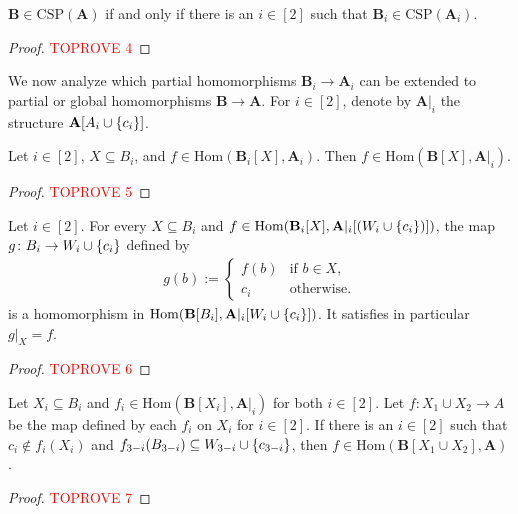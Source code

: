 \documentclass[a4paper,english, thm-restate]{lipics-v2021}
\DeclarePairedDelimiter\set{\lbrace}{\rbrace}
\newcommand{\StructA}{\mathbf{A}}
\newcommand{\StructB}{\mathbf{B}}
\newcommand{\CSP}[1]{\mathrm{CSP}(#1)}
\newcommand{\restrict}[2]{#1|_{#2}}
\newcommand{\Hom}[2]{\mathrm{Hom}(#1,#2)}
\begin{document}
	\begin{lemma}
		\label{lem:hom-or-construction-correct}
		$\StructB \in \CSP{\StructA}$ if and only if there is an $i \in [2]$
		such that $\StructB_i \in \CSP{\StructA_i}$.
	\end{lemma}
	\begin{proof}\textcolor{red}{TOPROVE 4}\end{proof}
	
	\noindent We now analyze which partial homomorphisms $\StructB_i \to \StructA_i$
	can be extended to partial or global homomorphisms $\StructB \to \StructA$.
	For $i\in[2]$, denote by $\restrict{\StructA}{i}$ the structure $\StructA[A_i\cup\set{c_i}]$.
	
	\begin{lemma}
		\label{lem:hom-or-embedd}
		Let $i \in [2]$, $X \subseteq B_i$, and
		$f \in \Hom{\StructB_i[X]}{\StructA_i}$.
		Then $f \in \Hom{\StructB[X]}{\restrict{\StructA}{i}}$.
	\end{lemma}
	\begin{proof}\textcolor{red}{TOPROVE 5}\end{proof}
	
	\begin{lemma}
		\label{lem:hom-or-extend}
		Let $i \in [2]$.
		For every $X \subseteq B_i$ and $f\in \Hom{\StructB_i[X]}{\restrict{\StructA}{i}[(W_i\cup \set{c_i})]}$,
		the map $g \colon B_i \to W_i \cup \set{c_i}$ defined by
		\begin{align*}
			g(b) := \begin{cases}
				f(b) & \text{if } b \in X, \\
				c_i	& \text{otherwise.}
			\end{cases}
		\end{align*}
		is a homomorphism in  $\Hom{\StructB[B_i]}{\restrict{\StructA}{i}[W_i\cup \set{c_i}]}$.
		It satisfies in particular $\restrict{g}{X} = f$. 
	\end{lemma}
	\begin{proof}\textcolor{red}{TOPROVE 6}\end{proof}
	
	\begin{lemma}
		\label{lem:hom-or-compose}
		Let $X_i \subseteq B_i$ and $f_i \in \Hom{\StructB[X_i]}{\restrict{\StructA}{i}}$ for both $i\in[2]$.
		Let $f\colon X_1\cup X_2 \to A$ be the map defined by each $f_i$ on $X_i$ for $i \in[2]$.
		If there is an $i\in[2]$ such that $c_i \notin f_i(X_i)$
		and $f_{3-i}(B_{3-i}) \subseteq W_{3-i} \cup \set{c_{3-i}}$,
		then $f \in \Hom{\StructB[X_1\cup X_2]}{\StructA}$.
	\end{lemma}
	\begin{proof}\textcolor{red}{TOPROVE 7}\end{proof}
	
\end{document}
